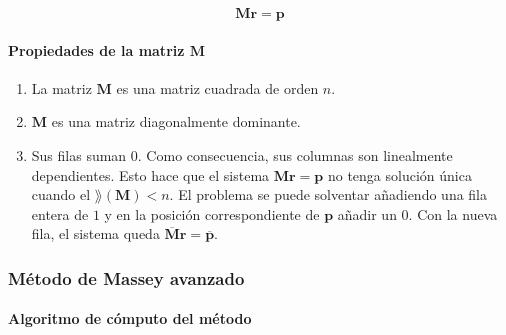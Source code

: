 \[ \mathbf{M r} = \mathbf{p} \]

\paragraph*{Propiedades de la matriz $\mathbf{M}$}

\begin{enumerate}
\item La matriz $\mathbf{M}$ es una matriz cuadrada de orden $n$.
\item $\mathbf{M}$ es una matriz diagonalmente dominante.
\item Sus filas suman $0$. Como consecuencia, sus columnas son linealmente dependientes. Esto hace que el sistema  $\mathbf{M r} = \mathbf{p}$ no tenga solución única cuando el $\rang(\mathbf{M}) < n$. El problema se puede solventar añadiendo una fila entera de $1$ y en la posición correspondiente de $\mathbf{p}$ añadir un $0$. Con la nueva fila, el sistema queda $\overline{\mathbf{M}} \mathbf{r} = \overline{\mathbf{p}}$.
\end{enumerate}


\subsubsection{Método de Massey avanzado}



\paragraph*{Algoritmo de cómputo del método}

